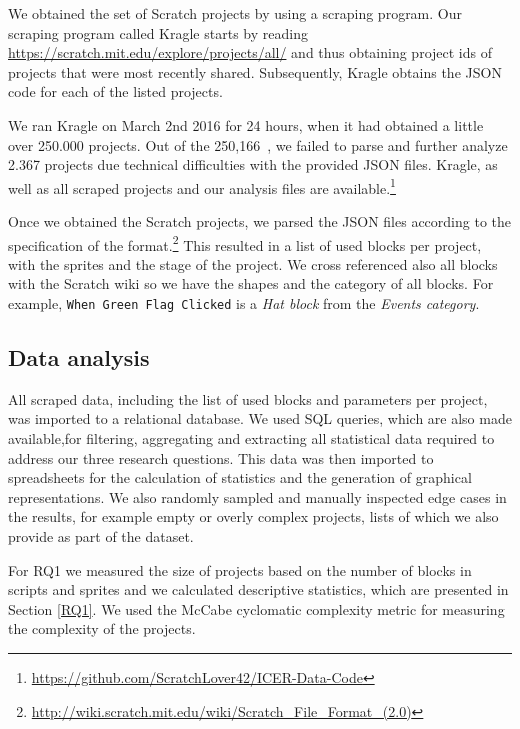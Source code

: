 \documentclass{sig-alternate}
\newcommand{\nPrograms}{250,166}
\begin{document}
We obtained the set of Scratch projects by using a scraping program. Our scraping program called Kragle starts by reading \url{https://scratch.mit.edu/explore/projects/all/} and thus obtaining project ids of projects that were most recently shared. Subsequently, Kragle obtains the JSON code for each of the listed projects. 


We ran Kragle on March 2nd 2016 for 24 hours, when it had obtained a little over 250.000 projects. Out of the \nPrograms~, we failed to parse and further analyze 2.367 projects due technical difficulties with the provided JSON files. Kragle, as well as all scraped projects and our analysis files are available.\footnote{\label{repo}\url{https://github.com/ScratchLover42/ICER-Data-Code}}

Once we obtained the Scratch projects, we parsed the JSON files according to the specification of the format.\footnote{\url{http://wiki.scratch.mit.edu/wiki/Scratch_File_Format_(2.0)}} This resulted in a list of used blocks per project, with the sprites and the stage of the project. We cross referenced also all blocks with the Scratch wiki so we have the shapes and the category of all blocks. For example, \texttt{When Green Flag Clicked} is a \emph{Hat block} from the \emph{Events category}.

\subsection{Data analysis}
\label{dataAnalysis}
All scraped data, including the list of used blocks and parameters per project, was imported to a relational database. We used SQL queries, which are also made available,\footnotemark[\ref{repo}] for filtering, aggregating and extracting all statistical data required to address our three research questions. This data was then imported to spreadsheets for the calculation of statistics and the generation of graphical representations. We also randomly sampled and manually inspected edge cases in the results, for example empty or overly complex projects, lists of which we also provide as part of the dataset.\footnotemark[\ref{repo}]

For RQ1 we measured the size of projects based on the number of blocks in scripts and sprites and we calculated descriptive statistics, which are presented in Section \ref{RQ1}. We used the McCabe cyclomatic complexity metric\cite{mcCabe76} for measuring the complexity of the projects.
\end{document}
